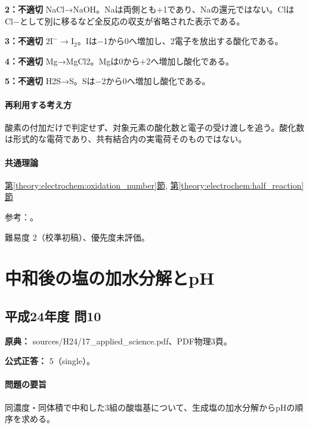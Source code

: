 \noindent\textbf{2：不適切} NaCl→NaOH。Naは両側とも+1であり、Naの還元ではない。ClはCl−として別に移るなど全反応の収支が省略された表示である。\par

\noindent\textbf{3：不適切} \(2\mathrm{I^-}\to\mathrm{I_2}\)。Iは−1から0へ増加し、2電子を放出する酸化である。\par

\noindent\textbf{4：不適切} Mg→MgCl2。Mgは0から+2へ増加し酸化である。\par

\noindent\textbf{5：不適切} H2S→S。Sは−2から0へ増加し酸化である。\par

\paragraph{再利用する考え方} 酸素の付加だけで判定せず、対象元素の酸化数と電子の受け渡しを追う。酸化数は形式的な電荷であり、共有結合内の実電荷そのものではない。

\paragraph{共通理論} \hyperref[theory:electrochem:oxidation_number]{第\ref*{theory:electrochem:oxidation_number}節}, \hyperref[theory:electrochem:half_reaction]{第\ref*{theory:electrochem:half_reaction}節}

\par 参考：\cite{mit_redox2014}。

\par 難易度 2（校準初稿）、優先度未評価。

\section{中和後の塩の加水分解とpH}

\subsection{平成24年度 問10}
\label{q:h24-reg-applied-10}

\noindent\textbf{原典：} sources/H24/17\_applied\_science.pdf、PDF物理3頁。

\textbf{公式正答：} 5（single）。

\paragraph{問題の要旨} 同濃度・同体積で中和した3組の酸塩基について、生成塩の加水分解からpHの順序を求める。

